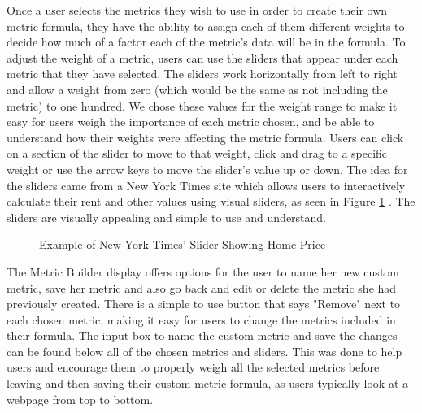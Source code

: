 			Once a user selects the metrics they wish to use in order to create their own metric formula, they have the ability to assign each of them different weights 
			to decide how much of a factor each of the metric's data will be in the formula. To adjust the weight of a metric, users can use the sliders that appear under 
			each metric that they have selected. The sliders work horizontally from left to right and allow a weight from zero (which would be the same as not including the metric) 
			to one hundred. We chose these values for the weight range to make it easy for users weigh the importance of each metric chosen, and be able to understand how their weights were affecting the metric formula. 
			Users can click on a section of the slider to move to that weight, click and drag to a specific weight or use the arrow keys to move the slider's value up or down. 
			The idea for the sliders came from a New York Times site which allows users to interactively calculate their rent and other values using visual sliders, as seen in Figure \ref{fig:slider} \cite{slider}. The sliders are 
			visually appealing and simple to use and understand.
			
			\begin{figure}[t]
				\centering
				\caption{Example of New York Times' Slider Showing Home Price}
				\label{fig:slider}
			\end{figure}
			
			
			The Metric Builder display offers options for the user to name her new custom metric, save her metric and also go back and edit or delete the metric she had previously created. There is a 
			simple to use button that says "Remove" next to each chosen metric, making it easy for users to change the metrics included in their formula. The input 
			box to name the custom metric and save the changes can be found below all of the chosen metrics and sliders. This was done to help users and encourage them to 
			properly weigh all the selected metrics before leaving and then saving their custom metric formula, as users typically look at a webpage from top to bottom.
		
